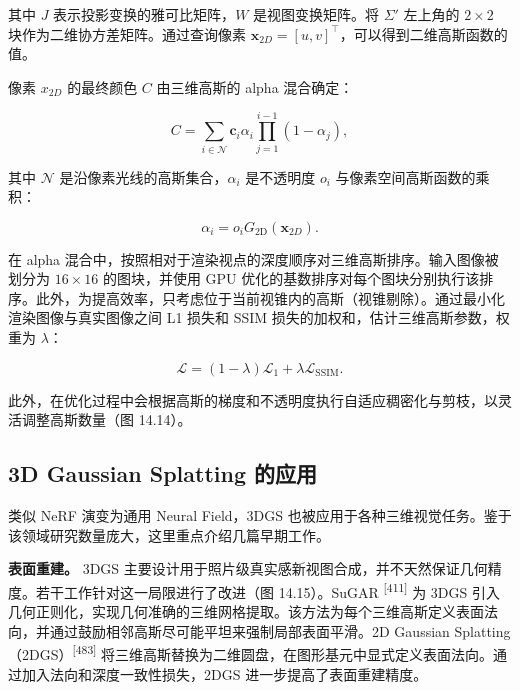 其中 $J$ 表示投影变换的雅可比矩阵，$W$ 是视图变换矩阵。将 $\Sigma'$ 左上角的 $2\times2$ 块作为二维协方差矩阵。通过查询像素 $\mathbf x_{2D}=[u,v]^\top$，可以得到二维高斯函数的值。

像素 $x_{2D}$ 的最终颜色 $C$ 由三维高斯的 alpha 混合确定：

\begin{equation}
C = \sum_ {i \in \mathcal {N}} \mathbf {c} _ {i} \alpha _ {i} \prod_ {j = 1} ^ {i - 1} (1 - \alpha _ {j}),\tag{14.6}
\end{equation}

其中 $\mathcal{N}$ 是沿像素光线的高斯集合，$\alpha_i$ 是不透明度 $o_i$ 与像素空间高斯函数的乘积：

\begin{equation}
\alpha_ {i} = o _ {i} G _ {\mathrm{2D}} \left(\mathbf {x} _ {2 D}\right).\tag{14.7}
\end{equation}

在 alpha 混合中，按照相对于渲染视点的深度顺序对三维高斯排序。输入图像被划分为 $16\times16$ 的图块，并使用 GPU 优化的基数排序对每个图块分别执行该排序。此外，为提高效率，只考虑位于当前视锥内的高斯（视锥剔除）。通过最小化渲染图像与真实图像之间 L1 损失和 SSIM 损失的加权和，估计三维高斯参数，权重为 $\lambda$：

\begin{equation}
\mathcal {L} = (1 - \lambda) \mathcal {L} _ {1} + \lambda \mathcal {L} _ {\mathrm{SSIM}}.\tag{14.8}
\end{equation}

此外，在优化过程中会根据高斯的梯度和不透明度执行自适应稠密化与剪枝，以灵活调整高斯数量（图 14.14）。

\subsection{3D Gaussian Splatting 的应用}

类似 NeRF 演变为通用 Neural Field，3DGS 也被应用于各种三维视觉任务。鉴于该领域研究数量庞大，这里重点介绍几篇早期工作。

\textbf{表面重建。} 3DGS 主要设计用于照片级真实感新视图合成，并不天然保证几何精度。若干工作针对这一局限进行了改进（图 14.15）。SuGAR \textsuperscript{[411]} 为 3DGS 引入几何正则化，实现几何准确的三维网格提取。该方法为每个三维高斯定义表面法向，并通过鼓励相邻高斯尽可能平坦来强制局部表面平滑。2D Gaussian Splatting（2DGS）\textsuperscript{[483]} 将三维高斯替换为二维圆盘，在图形基元中显式定义表面法向。通过加入法向和深度一致性损失，2DGS 进一步提高了表面重建精度。

